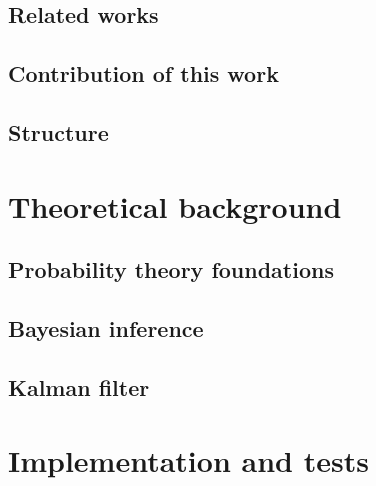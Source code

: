 \documentclass[english,master,unicode]{ctufit-thesis}
\theoremstyle{plain}
\theoremstyle{definition}
\theoremstyle{remark}
\numberwithin{theorem}{chapter}
\begin{document}
\section*{Related works}
\section*{Contribution of this work}
\section*{Structure}

\chapter{Theoretical background}
\section{Probability theory foundations}
\section{Bayesian inference}
\section{Kalman filter}

\chapter{Implementation and tests}
\end{document}
